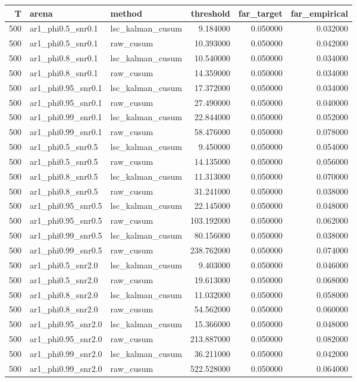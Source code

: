 \begin{tabular}{rllrrr}
\toprule
T & arena & method & threshold & far_target & far_empirical \\
\midrule
500 & ar1_phi0.5_snr0.1 & lsc_kalman_cusum & 9.184000 & 0.050000 & 0.032000 \\
500 & ar1_phi0.5_snr0.1 & raw_cusum & 10.393000 & 0.050000 & 0.042000 \\
500 & ar1_phi0.8_snr0.1 & lsc_kalman_cusum & 10.540000 & 0.050000 & 0.034000 \\
500 & ar1_phi0.8_snr0.1 & raw_cusum & 14.359000 & 0.050000 & 0.034000 \\
500 & ar1_phi0.95_snr0.1 & lsc_kalman_cusum & 17.372000 & 0.050000 & 0.034000 \\
500 & ar1_phi0.95_snr0.1 & raw_cusum & 27.490000 & 0.050000 & 0.040000 \\
500 & ar1_phi0.99_snr0.1 & lsc_kalman_cusum & 22.844000 & 0.050000 & 0.052000 \\
500 & ar1_phi0.99_snr0.1 & raw_cusum & 58.476000 & 0.050000 & 0.078000 \\
500 & ar1_phi0.5_snr0.5 & lsc_kalman_cusum & 9.450000 & 0.050000 & 0.054000 \\
500 & ar1_phi0.5_snr0.5 & raw_cusum & 14.135000 & 0.050000 & 0.056000 \\
500 & ar1_phi0.8_snr0.5 & lsc_kalman_cusum & 11.313000 & 0.050000 & 0.070000 \\
500 & ar1_phi0.8_snr0.5 & raw_cusum & 31.241000 & 0.050000 & 0.038000 \\
500 & ar1_phi0.95_snr0.5 & lsc_kalman_cusum & 22.145000 & 0.050000 & 0.048000 \\
500 & ar1_phi0.95_snr0.5 & raw_cusum & 103.192000 & 0.050000 & 0.062000 \\
500 & ar1_phi0.99_snr0.5 & lsc_kalman_cusum & 80.156000 & 0.050000 & 0.038000 \\
500 & ar1_phi0.99_snr0.5 & raw_cusum & 238.762000 & 0.050000 & 0.074000 \\
500 & ar1_phi0.5_snr2.0 & lsc_kalman_cusum & 9.403000 & 0.050000 & 0.046000 \\
500 & ar1_phi0.5_snr2.0 & raw_cusum & 19.613000 & 0.050000 & 0.068000 \\
500 & ar1_phi0.8_snr2.0 & lsc_kalman_cusum & 11.032000 & 0.050000 & 0.058000 \\
500 & ar1_phi0.8_snr2.0 & raw_cusum & 54.562000 & 0.050000 & 0.060000 \\
500 & ar1_phi0.95_snr2.0 & lsc_kalman_cusum & 15.366000 & 0.050000 & 0.048000 \\
500 & ar1_phi0.95_snr2.0 & raw_cusum & 213.887000 & 0.050000 & 0.082000 \\
500 & ar1_phi0.99_snr2.0 & lsc_kalman_cusum & 36.211000 & 0.050000 & 0.042000 \\
500 & ar1_phi0.99_snr2.0 & raw_cusum & 522.528000 & 0.050000 & 0.064000 \\
\bottomrule
\end{tabular}
